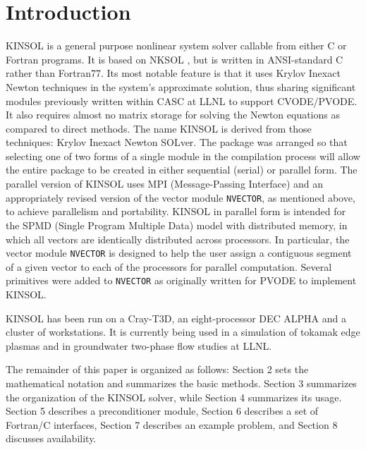 \documentclass[11pt]{article}
\begin{document}
\normalsize



\maketitle

\setcounter{page}{1}

\section{Introduction}

KINSOL is a general purpose nonlinear system solver callable from either
C or Fortran programs. It is based on NKSOL \cite{BrSa90}, but is written in
ANSI-standard C rather than Fortran77. Its most notable feature is that it
uses Krylov Inexact Newton techniques in the system's approximate solution, 
thus sharing significant modules previously written within CASC at LLNL to 
support CVODE\cite{CoHi94,CoHi96}/PVODE\cite{LDRD98,PVODEusrguide}. It 
also requires almost no matrix storage for solving the Newton equations as 
compared to direct methods. The name \mbox{KINSOL} is derived from those 
techniques: Krylov Inexact Newton SOLver. The package was arranged so that 
selecting one of two forms of a single module in the compilation process will
allow the entire package to be created in either sequential (serial) or 
parallel form. The parallel version of KINSOL uses MPI (Message-Passing 
Interface) \cite{MPI} and an appropriately revised version of the vector module
{\tt NVECTOR}, as mentioned above, to achieve parallelism and portability. 
KINSOL in parallel form is intended for the SPMD (Single Program Multiple Data)
model with distributed memory, in which all vectors are identically distributed
across processors. In particular, the vector module {\tt NVECTOR} is designed 
to help the user assign a contiguous segment of a given vector to each of the 
processors for parallel computation. Several primitives were added to 
{\tt NVECTOR} as originally written for PVODE to implement KINSOL.

KINSOL has been run on a Cray-T3D, an eight-processor DEC ALPHA
and a cluster of workstations.  It is currently being used in a simulation
of tokamak edge plasmas and in groundwater two-phase flow studies at LLNL. 

The remainder of this paper is organized as follows: Section 2 sets
the mathematical notation and summarizes the basic methods. Section 3
summarizes the organization of the KINSOL solver, while Section 4
summarizes its usage.  Section 5 describes a preconditioner module,
Section 6 describes a set of Fortran/C interfaces, Section 7
describes an example problem, and Section 8 discusses availability.
\end{document}
